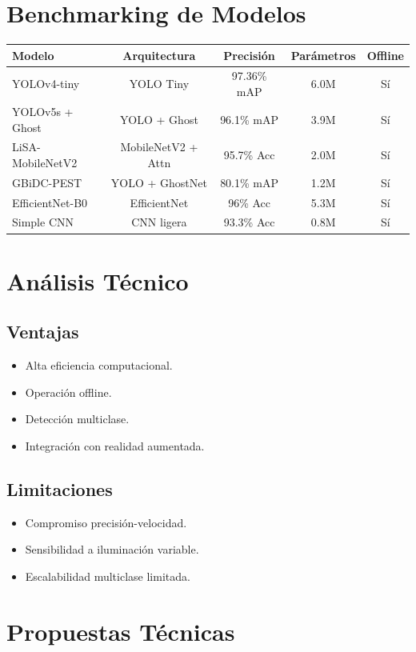 \documentclass[12pt]{article}
\begin{document}
\section{Benchmarking de Modelos}

\begin{longtable}{lcccc}
\toprule
Modelo & Arquitectura & Precisión & Parámetros & Offline \\
\midrule
YOLOv4-tiny & YOLO Tiny & 97.36\% mAP & 6.0M & Sí \\
YOLOv5s + Ghost & YOLO + Ghost & 96.1\% mAP & 3.9M & Sí \\
LiSA-MobileNetV2 & MobileNetV2 + Attn & 95.7\% Acc & 2.0M & Sí \\
GBiDC-PEST & YOLO + GhostNet & 80.1\% mAP & 1.2M & Sí \\
EfficientNet-B0 & EfficientNet & 96\% Acc & 5.3M & Sí \\
Simple CNN & CNN ligera & 93.3\% Acc & 0.8M & Sí \\
\bottomrule
\end{longtable}

\section{Análisis Técnico}

\subsection{Ventajas}
\begin{itemize}
\item Alta eficiencia computacional.
\item Operación offline.
\item Detección multiclase.
\item Integración con realidad aumentada.
\end{itemize}

\subsection{Limitaciones}
\begin{itemize}
\item Compromiso precisión-velocidad.
\item Sensibilidad a iluminación variable.
\item Escalabilidad multiclase limitada.
\end{itemize}

\section{Propuestas Técnicas}
\end{document}
